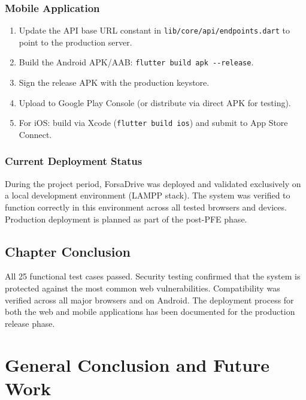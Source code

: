 \documentclass[12pt,a4paper,openright]{report}
\begin{document}
\subsection{Mobile Application}

\begin{enumerate}[noitemsep]
    \item Update the API base URL constant in \texttt{lib/core/api/endpoints.dart} to point to the production server.
    \item Build the Android APK/AAB: \texttt{flutter build apk -{}-release}.
    \item Sign the release APK with the production keystore.
    \item Upload to Google Play Console (or distribute via direct APK for testing).
    \item For iOS: build via Xcode (\texttt{flutter build ios}) and submit to App Store Connect.
\end{enumerate}

\subsection{Current Deployment Status}

During the project period, ForsaDrive was deployed and validated exclusively on a local development environment (LAMPP stack). The system was verified to function correctly in this environment across all tested browsers and devices. Production deployment is planned as part of the post-PFE phase.

\section*{Chapter Conclusion}

All 25 functional test cases passed. Security testing confirmed that the system is protected against the most common web vulnerabilities. Compatibility was verified across all major browsers and on Android. The deployment process for both the web and mobile applications has been documented for the production release phase.

\chapter{General Conclusion and Future Work}
\end{document}
